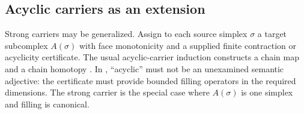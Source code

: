 \subsection{Acyclic carriers as an extension}

Strong carriers may be generalized.  Assign to each source simplex $\sigma$ a target subcomplex $A(\sigma)$ with face monotonicity and a supplied finite contraction or acyclicity certificate.  The usual acyclic-carrier induction constructs a chain map and a chain homotopy \cite{Munkres}.  In \ipra, ``acyclic'' must not be an unexamined semantic adjective: the certificate must provide bounded filling operators in the required dimensions.  The strong carrier is the special case where $A(\sigma)$ is one simplex and filling is canonical.
